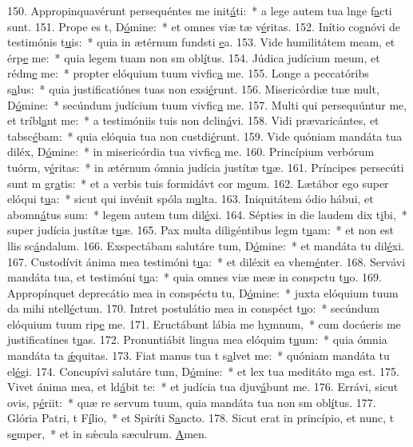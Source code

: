 150. Appropinquavérunt persequéntes me init\uline{á}ti:~* a lege autem tua lnge f\uline{a}cti sunt.
151. Prope es t, D\uline{ó}mine:~* et omnes viæ tæ v\uline{é}ritas.
152. Inítio cognóvi de testimónis t\uline{u}is:~* quia in ætérnum fundsti \uline{e}a.
153. Vide humilitátem meam, et érp\uline{e} me:~* quia legem tuam non sm obl\uline{í}tus.
154. Júdica judícium meum, et rédm\uline{e} me:~* propter elóquium tuum vivfic\uline{a} me.
155. Longe a peccatóribs s\uline{a}lus:~* quia justificatiónes tuas non exsi\uline{é}runt.
156. Misericórdiæ tuæ mult, D\uline{ó}mine:~* secúndum judícium tuum vivfic\uline{a} me.
157. Multi qui persequúntur me, et tríbl\uline{a}nt me:~* a testimóniis tuis non dclin\uline{á}vi.
158. Vidi prævaricántes, et tabsc\uline{é}bam:~* quia elóquia tua non custdi\uline{é}runt.
159. Vide quóniam mandáta tua diléx, D\uline{ó}mine:~* in misericórdia tua vivfic\uline{a} me.
160. Princípium verbórum tuórm, v\uline{é}ritas:~* in ætérnum ómnia judícia justítæ t\uline{u}æ.
161. Príncipes persecúti sunt m gr\uline{a}tis:~* et a verbis tuis formidávt cor m\uline{e}um.
162. Lætábor ego super elóqui t\uline{u}a:~* sicut qui invénit spóla m\uline{u}lta.
163. Iniquitátem ódio hábui, et abomn\uline{á}tus sum:~* legem autem tum dil\uline{é}xi.
164. Sépties in die laudem dix t\uline{i}bi,~* super judícia justítæ t\uline{u}æ.
165. Pax multa diligéntibus legm t\uline{u}am:~* et non est llis sc\uline{á}ndalum.
166. Exspectábam salutáre tum, D\uline{ó}mine:~* et mandáta tu dil\uline{é}xi.
167. Custodívit ánima mea testimóni t\uline{u}a:~* et diléxit ea vhem\uline{é}nter.
168. Servávi mandáta tua, et testimóni t\uline{u}a:~* quia omnes viæ meæ in conspctu t\uline{u}o.
169. Appropínquet deprecátio mea in conspéctu tu, D\uline{ó}mine:~* juxta elóquium tuum da mihi ntell\uline{é}ctum.
170. Intret postulátio mea in conspéct t\uline{u}o:~* secúndum elóquium tuum rip\uline{e} me.
171. Eructábunt lábia me h\uline{y}mnum,~* cum docúeris me justificatines t\uline{u}as.
172. Pronuntiábit lingua mea elóquim t\uline{u}um:~* quia ómnia mandáta ta \uline{ǽ}quitas.
173. Fiat manus tua t s\uline{a}lvet me:~* quóniam mandáta tu el\uline{é}gi.
174. Concupívi salutáre tum, D\uline{ó}mine:~* et lex tua meditáto m\uline{e}a est.
175. Vivet ánima mea, et ld\uline{á}bit te:~* et judícia tua djuv\uline{á}bunt me.
176. Errávi, sicut ovis,  p\uline{é}riit:~* quæ re servum tuum, quia mandáta tua non sm obl\uline{í}tus.
177. Glória Patri, t F\uline{í}lio,~* et Spiríti S\uline{a}ncto.
178. Sicut erat in princípio, et nunc, t s\uline{e}mper,~* et in sǽcula sæculrum. \uline{A}men.
